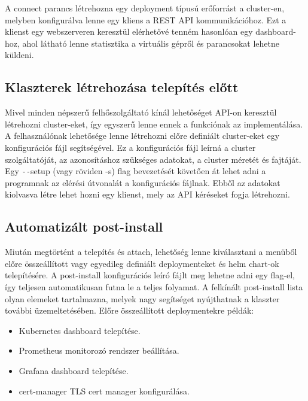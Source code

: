 A connect parancs létrehozna egy deployment típusú erőforrást a cluster-en, melyben konfigurálva lenne egy kliens a REST API kommunikációhoz.
Ezt a klienst egy webszerveren keresztül elérhetővé tenném hasonlóan egy dashboard-hoz, ahol látható lenne statisztika a virtuális gépről és parancsokat lehetne küldeni.

\subsection{Klaszterek létrehozása telepítés előtt}
Mivel minden népszerű felhőszolgáltató kínál lehetőséget API-on keresztül létrehozni cluster-eket, így egyszerű lenne ennek a funkciónak az implementálása.
A felhasználónak lehetősége lenne létrehozni előre definiált cluster-eket egy konfigurációs fájl segítségével.
Ez a konfigurációs fájl leírná a cluster szolgáltatóját, az azonosításhoz szükséges adatokat, a cluster méretét és fajtáját.
Egy \texttt{-{}-}setup (vagy röviden -s) flag bevezetését követően át lehet adni a programnak az elérési útvonalát a konfigurációs fájlnak.
Ebből az adatokat kiolvasva létre lehet hozni egy klienst, mely az API kéréseket fogja létrehozni.

\newpage

\subsection{Automatizált post-install}
Miután megtörtént a telepítés és attach, lehetőség lenne kiválasztani a menüből előre összeállított vagy egyedileg definiált deploymenteket és helm chart-ok telepítésére.
A post-install konfigurációs leíró fájlt meg lehetne adni egy flag-el, így teljesen automatikusan futna le a teljes folyamat.
A felkínált post-install lista olyan elemeket tartalmazna, melyek nagy segítséget nyújthatnak a klaszter további üzemeltetésében.
Előre összeállított deploymentekre példák:
\begin{itemize}
    \item Kubernetes dashboard telepítése.
    \item Prometheus monitorozó rendszer beállítása.
    \item Grafana dashboard telepítése.
    \item cert-manager TLS cert manager konfigurálása.
\end{itemize}
